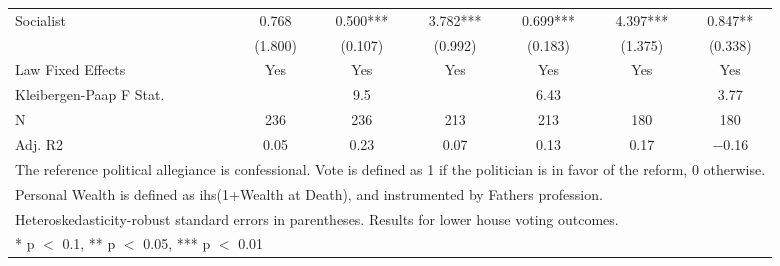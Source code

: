 \begin{table}
\begin{tabular}[t]{lcccccc}
Socialist & \num{0.768} & \num{0.500}*** & \num{3.782}*** & \num{0.699}*** & \num{4.397}*** & \num{0.847}**\\
 & (\num{1.800}) & (\num{0.107}) & (\num{0.992}) & (\num{0.183}) & (\num{1.375}) & (\num{0.338})\\
\midrule
Law Fixed Effects & Yes & Yes & Yes & Yes & Yes & Yes\\
Kleibergen-Paap F Stat. &  & 9.5 &  & 6.43 &  & 3.77\\
N & \num{236} & \num{236} & \num{213} & \num{213} & \num{180} & \num{180}\\
Adj. R2 & \num{0.05} & \num{0.23} & \num{0.07} & \num{0.13} & \num{0.17} & \num{-0.16}\\
\bottomrule
\multicolumn{7}{l}{\rule{0pt}{1em}The reference political allegiance is confessional. Vote is defined as 1 if the politician is in favor of the reform, 0 otherwise.}\\
\multicolumn{7}{l}{\rule{0pt}{1em}Personal Wealth is defined as ihs(1+Wealth at Death), and instrumented by Fathers profession.}\\
\multicolumn{7}{l}{\rule{0pt}{1em}Heteroskedasticity-robust standard errors in parentheses. Results for lower house voting outcomes.}\\
\multicolumn{7}{l}{\rule{0pt}{1em}* p $<$ 0.1, ** p $<$ 0.05, *** p $<$ 0.01}\\
\end{tabular}
\end{table}
